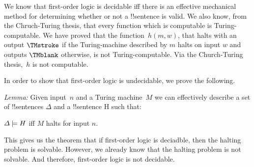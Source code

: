\documentclass[../../include/open-logic-section]{subfiles}
\begin{document}

\begin{explain}
We know that first-order logic is decidable iff there is an effective mechanical
method for determining whether or not a !!{sentence} is valid. We also know, from
the Chruch-Turing thesis, that every function which is computable is 
Turing-computable. We have proved that the function~$h(m,w)$, that halts with
an output $\TMstroke$ if the Turing-machine described by $m$ halts on input $w$ 
and outputs $\TMblank$ otherwise, is not Turing-computable. Via the Church-Turing
thesis,~$h$ is not computable. 

In order to show that first-order logic is undecidable, we prove the following.

\emph{Lemma:} Given input~$n$ and a Turing machine~$M$ we can effectively 
describe a set of !!{sentence}s $\Delta$ and a !!{sentence} H such that:

$\Delta \Entails H$ iff $M$ halts for input $n$.
\end{explain}

This gives us the theorem that if first-order logic is deciadble, then the halting problem
is solvable. However, we already know that the halting problem is not solvable. And
therefore, first-order logic is not decidable.
\end{document}
